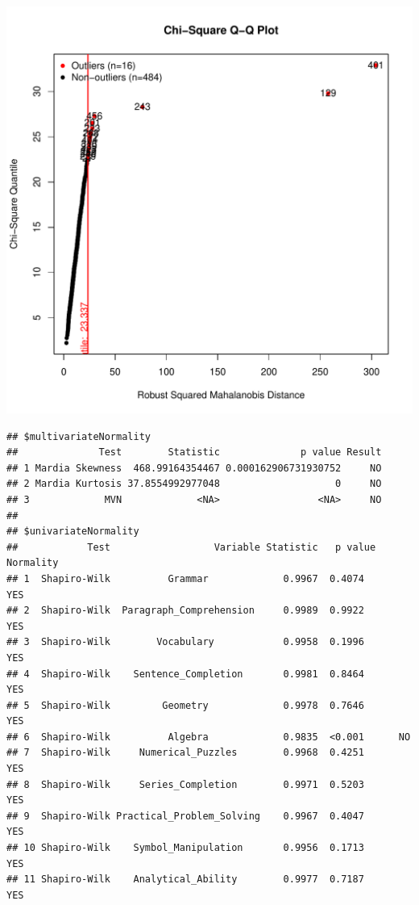 \documentclass{article}\usepackage[]{graphicx}\usepackage[]{color}
\makeatletter
\def\maxwidth{ %
  \ifdim\Gin@nat@width>\linewidth
    \linewidth
  \else
    \Gin@nat@width
  \fi
}
\newenvironment{kframe}{%
 \def\at@end@of@kframe{}%
 \ifinner\ifhmode%
  \def\at@end@of@kframe{\end{minipage}}%
  \begin{minipage}{\columnwidth}%
 \fi\fi%
 \def\FrameCommand##1{\hskip\@totalleftmargin \hskip-\fboxsep
 \colorbox{shadecolor}{##1}\hskip-\fboxsep
     \hskip-\linewidth \hskip-\@totalleftmargin \hskip\columnwidth}%
 \MakeFramed {\advance\hsize-\width
   \@totalleftmargin\z@ \linewidth\hsize
   \@setminipage}}%
 {\par\unskip\endMakeFramed%
 \at@end@of@kframe}
\newenvironment{knitrout}{}{} %
\makeatother
\begin{document}
\begin{knitrout}
\includegraphics[width=\maxwidth]{figure/unnamed-chunk-9-2} 
\begin{kframe}\begin{verbatim}
## $multivariateNormality
##              Test        Statistic              p value Result
## 1 Mardia Skewness  468.99164354467 0.000162906731930752     NO
## 2 Mardia Kurtosis 37.8554992977048                    0     NO
## 3             MVN             <NA>                 <NA>     NO
## 
## $univariateNormality
##            Test                  Variable Statistic   p value Normality
## 1  Shapiro-Wilk          Grammar             0.9967  0.4074      YES   
## 2  Shapiro-Wilk  Paragraph_Comprehension     0.9989  0.9922      YES   
## 3  Shapiro-Wilk        Vocabulary            0.9958  0.1996      YES   
## 4  Shapiro-Wilk    Sentence_Completion       0.9981  0.8464      YES   
## 5  Shapiro-Wilk         Geometry             0.9978  0.7646      YES   
## 6  Shapiro-Wilk          Algebra             0.9835  <0.001      NO    
## 7  Shapiro-Wilk     Numerical_Puzzles        0.9968  0.4251      YES   
## 8  Shapiro-Wilk     Series_Completion        0.9971  0.5203      YES   
## 9  Shapiro-Wilk Practical_Problem_Solving    0.9967  0.4047      YES   
## 10 Shapiro-Wilk    Symbol_Manipulation       0.9956  0.1713      YES   
## 11 Shapiro-Wilk    Analytical_Ability        0.9977  0.7187      YES   

\end{verbatim}
\end{kframe}
\end{knitrout}
\end{document}
